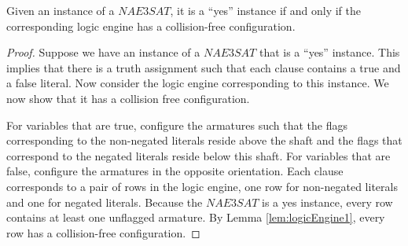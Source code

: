 \begin{thm}\label{thm:Satisfiability-1}
 Given an instance of a $NAE3SAT$,  it is a ``yes'' instance if and only if the corresponding logic 
engine has a collision-free configuration.
\end{thm}
\begin{proof}
Suppose we have an instance of a $NAE3SAT$ that is a ``yes'' instance. This implies that there is a 
truth assignment such that each clause contains a true and a false literal. Now consider the logic 
engine corresponding to this instance. We now 
show that it has a collision free configuration.

For variables that are true, configure the armatures such that the flags corresponding to the 
non-negated literals reside above the 
shaft and the flags that correspond to the negated literals reside below this shaft.  For variables 
that are false, configure the 
armatures in the opposite orientation.  Each clause corresponds to a pair of rows in 
the logic engine, one row for non-negated literals and one for negated literals.  Because the 
$NAE3SAT$ is a yes instance, every row contains at least one unflagged armature.  
By Lemma \ref{lem:logicEngine1}, every row  has a collision-free configuration.


\end{proof}
